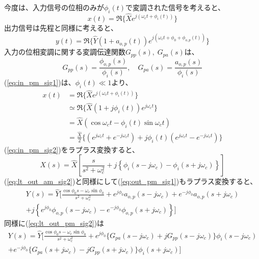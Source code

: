 \documentclass[book]{jlreq}
\begin{document}
今度は、入力信号の位相のみが$\phi_i(t)$で変調された信号を考えると、
%
\begin{equation}
    x(t) = \Re\{\hat{X} e^{j(\omega_ct + \phi_i(t))}\}
    \label{eq:in_pm_sig1}
\end{equation}
%
出力信号は先程と同様に考えると、
%
\begin{equation}
    y(t) = \Re\{\hat{Y}(1+a_{o, p}(t))e^{j(\omega_c t + \phi_0 + \phi_{o, p}(t))}\}
    \label{eq:out_pm_sig1}
\end{equation}
%
入力の位相変調に関する変調伝達関数$G_{pp}(s),\;G_{pa}(s)$は、
%
\begin{equation}
    G_{pp}(s) = \frac{\phi_{o, p}(s)}{\phi_i(s)}, \quad G_{pa}(s) = \frac{a_{o, p}(s)}{\phi_i(s)}
    \label{eq:pm_tf}
\end{equation}
%
(\ref{eq:in_pm_sig1})は、$\phi_i(t) \ll 1$より、
%
\begin{equation}
    \begin{split}
        x(t) &= \Re\{\hat{X} e^{j(\omega_c t + \phi_i(t))}\} \\
        &\simeq \Re\{\hat{X}(1+j\phi_i(t)) e^{j\omega_c t}\} \\
        &= \hat{X} (\cos\omega_c t - \phi_i(t)\sin\omega_c t ) \\
        &= \frac{\hat{X}}{2}\{(e^{j\omega_c t} + e^{-j\omega_c t}) + j \phi_i(t)(e^{j\omega_c t} - e^{-j\omega_c t})\}
        \label{eq:in_pm_sig2}
    \end{split}
\end{equation}
%
(\ref{eq:in_pm_sig2})をラプラス変換すると、
%
\begin{equation}
    X(s) = \hat{X}\left [\frac{s}{s^2+\omega_c^2}
        + j \left \{\phi_i(s - j\omega_c) - \phi_i(s+j\omega_c)\right \} \right ]
    \label{eq:lt_in_pm_sig2}
\end{equation}
%
(\ref{eq:lt_out_am_sig2})と同様にして(\ref{eq:out_pm_sig1})もラプラス変換すると、
%
\begin{multline}
    Y(s) = \hat{Y}\biggr [\frac{\cos\phi_0 s - \omega_c\sin\phi_0}{s^2+\omega_c^2}
    + e^{j\phi_0}a_{o, p}(s - j\omega_c) + e^{-j\phi_0}a_{o, p}(s+j\omega_c) \\
    + j\left \{e^{j\phi_0}\phi_{o,p}(s-j\omega_c) - e^{-j\phi_0}\phi_{o,p}(s+j\omega_c) \right \} \biggl ]
    \label{eq:lt_out_pm_sig2}
\end{multline}
%
同様に(\ref{eq:lt_out_pm_sig2})は
%
\begin{multline}
    Y(s) = \hat{Y}\biggr [\frac{\cos\phi_0 s - \omega_c\sin\phi_0}{s^2+\omega_c^2}
        + e^{j\phi_0}\{G_{pa}(s-j\omega_c)+j G_{pp}(s-j\omega_c)\}\phi_i(s-j\omega_c) \\
        + e^{-j\phi_0}\{G_{pa}(s+j\omega_c)- j G_{pp}(s+j\omega_c)\}\phi_i(s+j\omega_c)\biggl ]
    \label{eq:lt_out_pm_sig3}
\end{multline}
\end{document}
